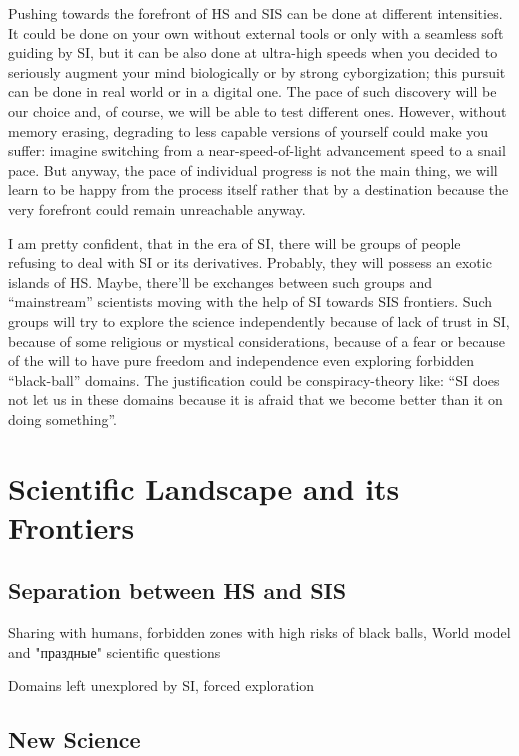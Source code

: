 \documentclass[a4paper,11pt]{article}
\begin{document}
    Pushing towards the forefront of HS and SIS can be done at different intensities. It could be done on your own without external tools or only with a seamless soft guiding by SI, but it can be also done at ultra-high speeds when you decided to seriously augment your mind biologically or by strong cyborgization; this pursuit can be done in real world or in a digital one. The pace of such discovery will be our choice and, of course, we will be able to test different ones. However, without memory erasing, degrading to less capable versions of yourself could make you suffer: imagine switching from a near-speed-of-light advancement speed to a snail pace. But anyway, the pace of individual progress is not the main thing, we will learn to be happy from the process itself rather that by a destination because the very forefront could remain unreachable anyway.  

    I am pretty confident, that in the era of SI, there will be groups of people refusing to deal with SI or its derivatives. Probably, they will possess an exotic islands of HS. Maybe, there'll be exchanges between such groups and ``mainstream'' scientists moving with the help of SI towards SIS frontiers. Such groups will try to explore the science independently because of lack of trust in SI, because of some religious or mystical considerations, because of a fear or because of the will to have pure freedom and independence even exploring forbidden ``black-ball'' domains. The justification could be conspiracy-theory like: ``SI does not let us in these domains because it is afraid that we become better than it on doing something''.
        
    \section{Scientific Landscape and its Frontiers}

        \subsection{Separation between HS and SIS}

        Sharing with humans, forbidden zones with high risks of black balls, World model and "праздные" scientific questions

        Domains left unexplored by SI, forced exploration

        \subsection{New Science}
\end{document}
